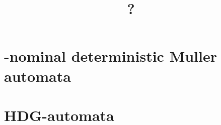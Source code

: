 \documentclass{elsarticle}
\title{?}
\theoremstyle{plain}
\theoremstyle{definition}
\theoremstyle{remark}
\begin{document}
 \begin{abstract}
\end{abstract}

\maketitle

\section{\nomG-nominal deterministic Muller automata}


\section{HDG-automata}


%
%
%
%
%
%
%
%
%
%
%
%
%
%
%
%



\end{document}

